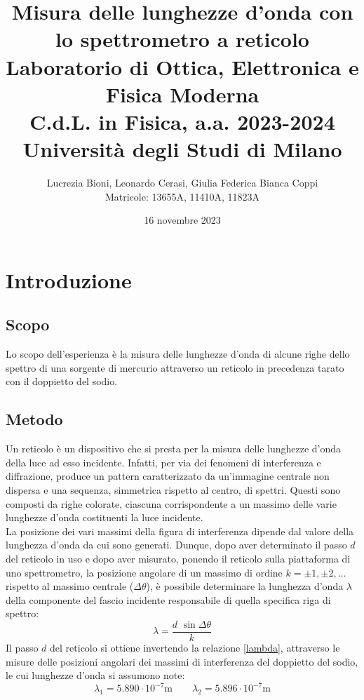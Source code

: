 \documentclass[]{article}
\title{%
    \Huge Misura delle lunghezze d'onda con lo spettrometro a reticolo \\
    \Large Laboratorio di Ottica, Elettronica e Fisica Moderna \\ C.d.L. in Fisica, a.a. 2023-2024 \\ Università degli Studi di Milano}
\author{\LARGE Lucrezia Bioni, Leonardo Cerasi, Giulia Federica Bianca Coppi \\ Matricole: 13655A, 11410A, 11823A}
\date{16 novembre 2023}
\let\oldsection\section%
\renewcommand{\section}{%
	\renewcommand{\theequation}{\thesection.\arabic{equation}}%
	\oldsection}%
\let\oldsubsection\subsection%
\renewcommand{\subsection}{%
	\renewcommand{\theequation}{\thesubsection.\arabic{equation}}%
	\oldsubsection}%
\begin{document}
    \maketitle

    \section{Introduzione}

    \subsection{Scopo}
    Lo scopo dell'esperienza è la misura delle lunghezze d'onda di alcune righe dello spettro di una sorgente di mercurio attraverso un reticolo in precedenza tarato con il doppietto del sodio.

    \subsection{Metodo}
    Un reticolo è un dispositivo che si presta per la misura delle lunghezze d'onda della luce ad esso incidente. Infatti, per via dei fenomeni di interferenza e diffrazione, produce un pattern caratterizzato da un'immagine centrale non dispersa e una sequenza, simmetrica rispetto al centro, di spettri. Questi sono composti da righe colorate, ciascuna corrispondente a un massimo delle varie lunghezze d'onda costituenti la luce incidente. \\
    La posizione dei vari massimi della figura di interferenza dipende dal valore della lunghezza d'onda da cui sono generati. Dunque, dopo aver determinato il passo $d$ del reticolo in uso e dopo aver misurato, ponendo il reticolo sulla piattaforma di uno spettrometro, la posizione angolare di un massimo di ordine $k=\pm 1, \pm 2,\ldots$ rispetto al massimo centrale ($\Delta \theta$), è possibile determinare la lunghezza d'onda $\lambda$ della componente del fascio incidente responsabile di quella specifica riga di spettro:
    \begin{equation}
        \label{lambda}
        \lambda = \frac{d \, \, \sin{\Delta\theta}}{k}
    \end{equation}
    Il passo $d$ del reticolo si ottiene invertendo la relazione \ref{lambda}, attraverso le misure delle posizioni angolari dei massimi di interferenza del doppietto del sodio, le cui lunghezze d'onda si assumono note:
    \begin{equation}
        \label{lambda-sodio}
        \lambda_1 = 5.890 \cdot 10^{-7} \text{m} \qquad \lambda_2 = 5.896 \cdot 10^{-7} \text{m}
    \end{equation}
\end{document}
